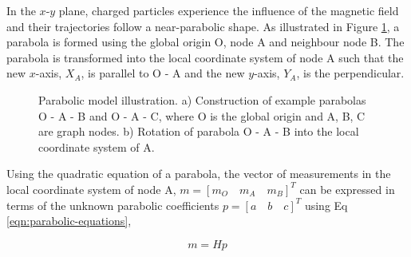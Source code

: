 In the $x$-$y$ plane, charged particles experience the influence of the magnetic field and their trajectories follow a near-parabolic shape. As illustrated in Figure \ref{fig:gnn-parabolic-model}, a parabola is formed using the global origin O, node A and neighbour node B. The parabola is transformed into the local coordinate system of node A such that the new $x$-axis, $X_A$, is parallel to O - A and the new $y$-axis, $Y_A$, is the perpendicular. 

\begin{figure}[htbp!] 
    \centering
    \hfill%
    \caption{Parabolic model illustration. a) Construction of example parabolas O - A - B and O - A - C, where O is the global origin and A, B, C are graph nodes. b) Rotation of parabola O - A - B into the local coordinate system of A.}
    \label{fig:gnn-parabolic-model}
\end{figure}


Using the quadratic equation of a parabola, the vector of measurements in the local coordinate system of node A, $ m = [m_O \quad m_A \quad m_B]^{T}$ can be expressed in terms of the unknown parabolic coefficients $p = [a \quad b \quad c]^{T}$ using Eq \eqref{eqn:parabolic-equations}, 

\begin{equation}
    m = H p 
    \label{eqn:parabolic-equations}
\end{equation}

